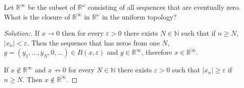 \documentclass[a4paper,12pt, reqno]{article}
\theoremstyle{definition}
\newenvironment{exerr}[1]{
  \renewcommand\theexeralt{#1}
  \exeralt
}{\endexeralt}
\newenvironment{solution}{\begin{proof}[Solution:]}{\end{proof}}
\newcommand{\R}{\mathbb{R}}
\newcommand{\N}{\mathbb{N}}
\begin{document}
\begin{exerr}{5}
  Let $\R^\infty$ be the subset of $\R^\omega$ consisting of all sequences that are eventually zero. What is the closure of $\R^\infty$ in $\R^\omega$ in the uniform topology?
\end{exerr}
\begin{solution}
  If $x\to0$ then for every $\varepsilon>0$ there exists $N\in\N$ such that if $n\geq N$, $|x_{n}|<\varepsilon$. Then the sequence that has zeros from one $N$, $y = (y_{1},\dots,y_{N},0,\dots)\in B(x,\varepsilon)$ and $y\in\R^\infty$, therefore $x\in\overline{\R^\infty}$.

  If $x\notin\R^\infty$ and $x\not\to0$ for every $N\in\N$ there exists $\varepsilon>0$ such that $|x_{n}|\geq \varepsilon$ if $n\geq N$. Then $x\notin\overline{\R^\infty}$.
\end{solution}
\end{document}
